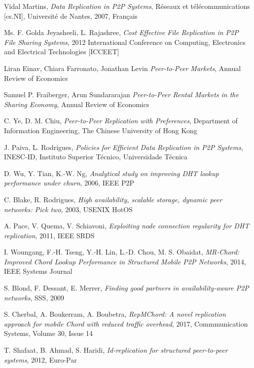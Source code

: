 \documentclass[12pt, twoside, openany]{report}
\begin{document}
\begin{thebibliography}{11}

 Vidal Martins, \emph{Data Replication in P2P Systems}, Réseaux et télécommunications [cs.NI], Université de Nantes, 2007, Français

 Ms. F. Golda Jeyasheeli, L. Rajashree, \emph{Cost Effective File Replication in P2P File Sharing Systems}, 2012 International Conference on Computing, Electronics and Electrical Technologies [ICCEET]
 
 Liran Einav, Chiara Farronato, Jonathan Levin \emph{Peer-to-Peer Markets}, Annual Review of Economics

 Samuel P. Fraiberger, Arun Sundararajan \emph{Peer-to-Peer Rental Markets in the Sharing Economy}, Annual Review of Economics

 C. Ye, D. M. Chiu, \emph{Peer-to-Peer Replication with Preferences}, Department of Information Engineering, The Chinese University of Hong Kong

 J. Paiva, L. Rodrigues, \emph{Policies for Efficient Data Replication in P2P Systems}, INESC-ID, Instituto Superior Técnico, Universidade Técnica

 D. Wu, Y. Tian, K.-W. Ng, \emph{Analytical study on improving DHT lookup performance under churn}, 2006, IEEE P2P

 C. Blake, R. Rodrigues, \emph{High availability, scalable storage, dynamic peer networks: Pick two}, 2003, USENIX HotOS

 A. Pace, V. Quema, V. Schiavoni, \emph{Exploiting node connection regularity for DHT replication}, 2011, IEEE SRDS

 I. Woungang, F.-H. Tseng, Y.-H. Lin, L.-D. Chou, M. S. Obaidat, \emph{MR-Chord: Improved Chord Lookup Performance in Structured Mobile P2P Networks}, 2014, IEEE Systems Journal

 S. Blond, F. Dessant, E. Merrer, \emph{Finding good partners in availability-aware P2P networks}, SSS, 2009

 S. Cherbal, A. Boukerram, A. Boubetra, \emph{RepMChord: A novel replication approach for mobile Chord with reduced traffic overhead}, 2017, Commmunication Systems, Volume 30, Issue 14

 T. Shafaat, B. Ahmad, S. Haridi, \emph{Id-replication for structured peer-to-peer systems}, 2012, Euro-Par


\end{thebibliography}
\end{document}
